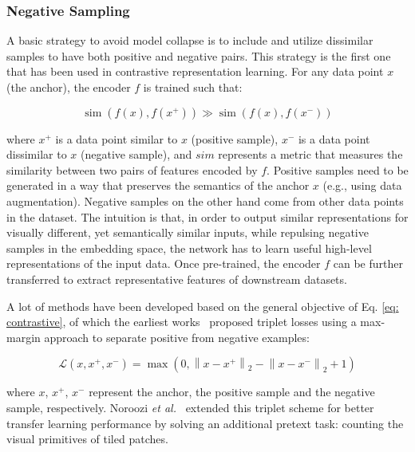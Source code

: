 \documentclass[lettersize,journal]{IEEEtran}
\newcommand{\etal}{\textit{et al.}}
\begin{document}
\subsubsection{Negative Sampling}

A basic strategy to avoid model collapse is to include and utilize dissimilar samples to have both positive and negative pairs. This strategy is the first one that has been used in contrastive representation learning. For any data point $x$ (the anchor), the encoder $f$ is trained such that:

\begin{equation}
\label{eq: contrastive}
\operatorname{sim}\left(f(x), f\left(x^{+}\right)\right)\gg\operatorname{sim}\left(f(x), f\left(x^{-}\right)\right)
\end{equation}

\noindent where $x^{+}$ is a data point similar to $x$ (positive sample), $x^{-}$ is a data point dissimilar to $x$ (negative sample), and $sim$ represents a metric that measures the similarity between two pairs of features encoded by $f$. Positive samples need to be generated in a way that preserves the semantics of the anchor $x$ (e.g., using data augmentation). Negative samples on the other hand come from other data points in the dataset. The intuition is that, in order to output similar representations for visually different, yet semantically similar inputs, while repulsing negative samples in the embedding space, the network has to learn useful high-level representations of the input data. Once pre-trained, the encoder $f$ can be further transferred to extract representative features of downstream datasets.  

A lot of methods have been developed based on the general objective of Eq. \ref{eq: contrastive}, of which the earliest works~\cite{chopra2005learning,weinberger2009distance,schroff2015facenet} proposed triplet losses using a max-margin approach to separate positive from negative examples:

\begin{equation}
\mathcal{L}\left(x, x^{+}, x^{-}\right)=\max \left(0,\left\|x-x^{+}\right\|_{2}-\left\|x-x^{-}\right\|_{2}+1\right)
\end{equation}

\noindent where $x$, $x^{+}$, $x^{-}$ represent the anchor, the positive sample and the negative sample, respectively. Noroozi \etal~\cite{noroozi2017representation} extended this triplet scheme for better transfer learning performance by solving an additional pretext task: counting the visual primitives of tiled patches.
\end{document}
